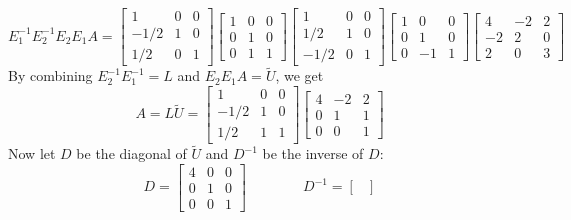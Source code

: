 \documentclass[11pt]{article}
\begin{document}
\begin{exercise}{4}
{        $$ E_1^{-1} E_2^{-1} E_2 E_1 A =
        \begin{bmatrix}
            1 & 0 & 0 \\
            -1/2 & 1 & 0 \\
            1/2 & 0 & 1
        \end{bmatrix}
        \begin{bmatrix}
            1 & 0 & 0 \\
            0 & 1 & 0 \\
            0 & 1 & 1
        \end{bmatrix}
        \begin{bmatrix}
            1 & 0 & 0 \\
            1/2 & 1 & 0 \\
            -1/2 & 0 & 1
        \end{bmatrix}
        \begin{bmatrix}
            1 & 0 & 0 \\
            0 & 1 & 0 \\
            0 & -1 & 1
        \end{bmatrix}
        \begin{bmatrix}
            4 & -2 & 2 \\
            -2 & 2 & 0 \\
            2 & 0 & 3
        \end{bmatrix}
        $$
        By combining $E_2^{-1} E_1^{-1} = L$ and $E_2 E_1 A = \tilde{U}$, we get
        $$ A = L \tilde{U} =
        \begin{bmatrix}
            1 & 0 & 0 \\
            -1/2 & 1 & 0 \\
            1/2 & 1 & 1
        \end{bmatrix}
        \begin{bmatrix}
            4 & -2 & 2 \\
            0 & 1 & 1 \\
            0 & 0 & 1
        \end{bmatrix}
        $$
        Now let $D$ be the diagonal of $\tilde{U}$ and $D^{-1}$ be the inverse of $D$:
        $$ D =
        \begin{bmatrix}
            4 & 0 & 0 \\
            0 & 1 & 0 \\
            0 & 0 & 1
        \end{bmatrix}
        \hspace{4em}
        D^{-1} =
        \begin{bmatrix}

\end{bmatrix}$$}
\end{exercise}
\end{document}
